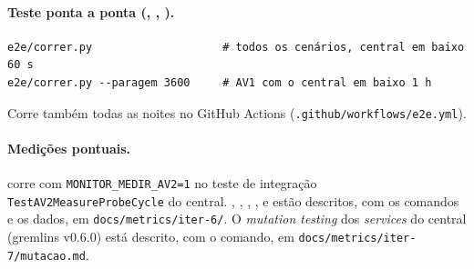 \paragraph{Teste ponta a ponta (, , ).}
\begin{verbatim}
e2e/correr.py                    # todos os cenários, central em baixo 60 s
e2e/correr.py --paragem 3600     # AV1 com o central em baixo 1 h
\end{verbatim}
Corre também todas as noites no GitHub Actions (\texttt{.github/workflows/e2e.yml}).

\paragraph{Medições pontuais.}
 corre com \texttt{MONITOR\_MEDIR\_AV2=1} no teste de integração \texttt{TestAV2MeasureProbeCycle} do
central. , , , ,  e  estão descritos, com os comandos e
os dados, em \texttt{docs/metrics/iter-6/}. O \emph{mutation testing} dos \emph{services} do central (gremlins v0.6.0)
está descrito, com o comando, em \texttt{docs/metrics/iter-7/mutacao.md}.
